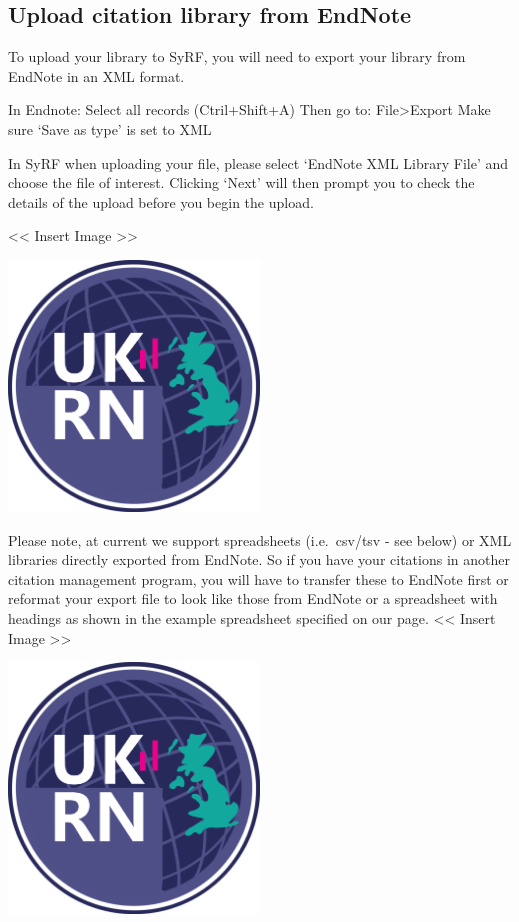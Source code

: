 \documentclass[
]{book}
\begin{document}
\hypertarget{upload-citation-library-from-endnote}{%
\subsection{Upload citation library from EndNote}\label{upload-citation-library-from-endnote}}

To upload your library to SyRF, you will need to export your library from EndNote in an XML format.

In Endnote: Select all records (Ctril+Shift+A)
Then go to: File\textgreater{}Export
Make sure `Save as type' is set to XML

In SyRF when uploading your file, please select `EndNote XML Library File' and choose the file of interest. Clicking `Next' will then prompt you to check the details of the upload before you begin the upload.

\textless{}\textless{} Insert Image \textgreater{}\textgreater{}

\includegraphics[width=0.5\textwidth,height=0.5\textheight]{figs/evidence-triangle.png}

Please note, at current we support spreadsheets (i.e.~csv/tsv - see below) or XML libraries directly exported from EndNote. So if you have your citations in another citation management program, you will have to transfer these to EndNote first or reformat your export file to look like those from EndNote or a spreadsheet with headings as shown in the example spreadsheet specified on our page.
\textless{}\textless{} Insert Image \textgreater{}\textgreater{}

\includegraphics[width=0.5\textwidth,height=0.5\textheight]{figs/evidence-triangle.png}
\end{document}
